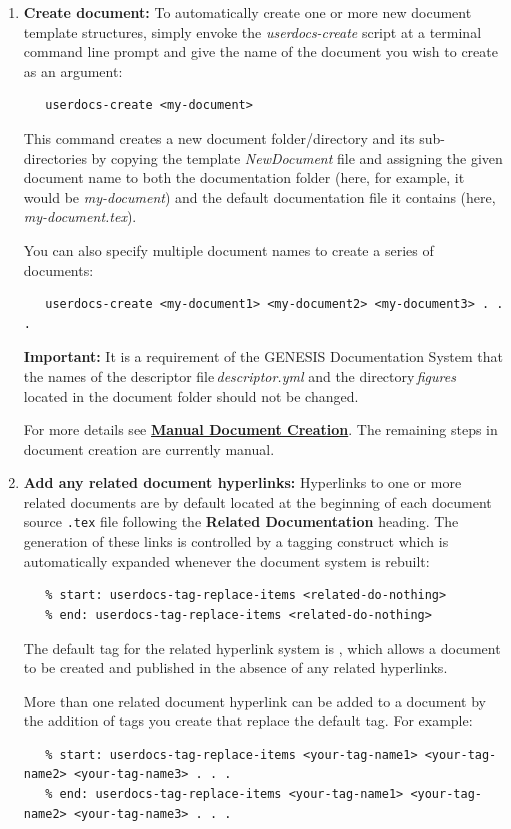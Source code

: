 \documentclass[12pt]{article}
\begin{document}
\begin{enumerate}

\item {\bf Create document:}  To automatically create one or more new document template structures, simply envoke the {\it userdocs-create} script at a terminal command line prompt and give the name of the document you wish to create as an argument:
\begin{verbatim}
   userdocs-create <my-document>
\end{verbatim}
This command creates a new document folder/directory and its sub-directories by copying the template {\it NewDocument} file and assigning the given document name to both the documentation folder (here, for example, it would be {\it my-document}) and the default documentation file it contains (here, {\it my-document.tex}).

You can also specify multiple document names to create a series of documents:
\begin{verbatim}
   userdocs-create <my-document1> <my-document2> <my-document3> . . .
\end{verbatim}
{\bf Important:} It is a requirement of the GENESIS Documentation System that the names of the descriptor file\,{\it descriptor.yml} and the directory\,{\it figures} located in the document folder should not be changed.

For more details see \href{../document-create-manual/document-create-manual.tex}{\bf Manual Document Creation}. The remaining steps in document creation are currently manual.

\item {\bf Add any related document hyperlinks:} Hyperlinks to one or more related documents are by default located at the beginning of each document source {\tt .tex} file following the {\bf Related Documentation} heading. The generation of these links is controlled by a tagging construct which is automatically expanded whenever the document system is rebuilt:
\begin{verbatim}
   % start: userdocs-tag-replace-items <related-do-nothing>
   % end: userdocs-tag-replace-items <related-do-nothing>
\end{verbatim}
The default tag for the related hyperlink system is {\tt <related-do-nothing>}, which allows a document to be created and published in the absence of any related hyperlinks. 

More than one related document hyperlink can be added to a document by the addition of tags you create that replace the default tag. For example:
\begin{verbatim}
   % start: userdocs-tag-replace-items <your-tag-name1> <your-tag-name2> <your-tag-name3> . . .
   % end: userdocs-tag-replace-items <your-tag-name1> <your-tag-name2> <your-tag-name3> . . .
\end{verbatim}


\end{enumerate}
\end{document}
